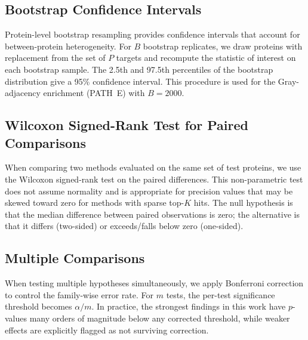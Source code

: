 \subsection{Bootstrap Confidence Intervals}

Protein-level bootstrap resampling provides confidence intervals that account
for between-protein heterogeneity.  For $B$ bootstrap replicates, we draw
proteins with replacement from the set of $P$ targets and recompute the
statistic of interest on each bootstrap sample.  The 2.5th and 97.5th
percentiles of the bootstrap distribution give a 95\% confidence interval.
This procedure is used for the Gray-adjacency enrichment (PATH~E) with $B =
	2000$.

\subsection{Wilcoxon Signed-Rank Test for Paired Comparisons}

When comparing two methods evaluated on the same set of test proteins, we use
the Wilcoxon signed-rank test on the paired differences.  This non-parametric
test does not assume normality and is appropriate for precision values that
may be skewed toward zero for methods with sparse top-$K$ hits.  The null
hypothesis is that the median difference between paired observations is zero;
the alternative is that it differs (two-sided) or exceeds/falls below zero
(one-sided).

\subsection{Multiple Comparisons}

When testing multiple hypotheses simultaneously, we apply Bonferroni
correction to control the family-wise error rate.  For $m$ tests, the
per-test significance threshold becomes $\alpha / m$.  In practice, the
strongest findings in this work have $p$-values many orders of magnitude below
any corrected threshold, while weaker effects are explicitly flagged as not
surviving correction.
